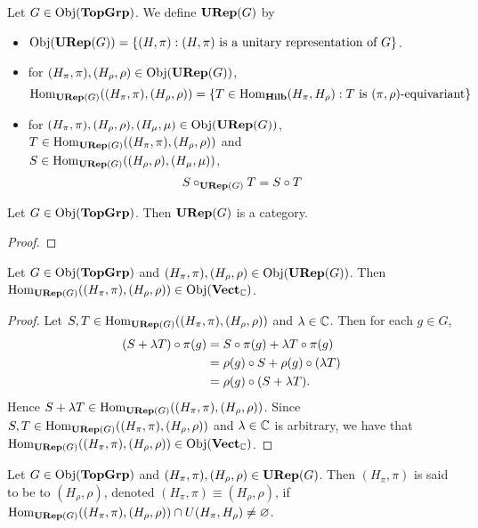 \documentclass{book}
\begin{document}
	\begin{defn} 
		Let $G \in \Obj(\TopGrp)$. We define $\URep(G)$ by 
		\begin{itemize}
			\item $\Obj(\URep(G)) = \{(H, \pi): (H, \pi) \text{ is a unitary representation of $G$}\}$.
			\item for $(H_{\pi}, \pi),(H_{\rho}, \rho) \in \Obj(\URep(G))$, 
			$$\Hom_{\URep(G)}((H_{\pi}, \pi), (H_{\rho}, \rho)) = \{T \in \Hom_{\Hilb}(H_{\pi}, H_{\rho}): T \text{ is $(\pi, \rho)$-equivariant} \}$$
			\item for $(H_{\pi}, \pi), (H_{\rho}, \rho), (H_{\mu}, \mu) \in \Obj(\URep(G))$, $T \in \Hom_{\URep(G)}((H_{\pi}, \pi), (H_{\rho}, \rho))$ and \\
			$S \in  \Hom_{\URep(G)}((H_{\rho}, \rho), (H_{\mu}, \mu))$, 
			$$S \circ_{\URep(G)} T = S \circ T$$
		\end{itemize}
	\end{defn}
	
	\begin{ex}
		Let $G \in \Obj(\TopGrp)$. Then $\URep(G)$ is a category.
	\end{ex}
	
	\begin{proof}
	\end{proof}

	\begin{ex}
		Let $G \in \Obj(\TopGrp)$ and $(H_{\pi}, \pi), (H_{\rho}, \rho) \in \Obj(\URep(G))$. Then $\Hom_{\URep(G)}((H_{\pi}, \pi), (H_{\rho}, \rho)) \in \Obj(\VectC)$.
	\end{ex}

	\begin{proof}
		Let $S,T \in \Hom_{\URep(G)}((H_{\pi}, \pi), (H_{\rho}, \rho)) $ and $\lam \in \C$. Then for each $g \in G$,
		\begin{align*}
			(S + \lam T) \circ \pi(g) 
			& = S \circ \pi(g)  + \lam T \circ \pi(g) \\
			& = \rho(g) \circ S + \rho(g) \circ (\lam T) \\
			& = \rho(g) \circ (S + \lam T).
		\end{align*}
		Hence $S + \lam T \in \Hom_{\URep(G)}((H_{\pi}, \pi), (H_{\rho}, \rho)) $. Since $S, T \in \Hom_{\URep(G)}((H_{\pi}, \pi), (H_{\rho}, \rho)) $ and $\lam \in \C$ is arbitrary, we have that $\Hom_{\URep(G)}((H_{\pi}, \pi), (H_{\rho}, \rho)) \in \Obj(\VectC)$.
	\end{proof}
	
	\begin{defn}
		Let $G \in \Obj(\TopGrp)$ and $(H_{\pi}, \pi), (H_{\rho}, \rho) \in \URep(G)$. Then $(H_{\pi}, \pi)$ is said to be  to $(H_{\rho}, \rho)$, denoted $(H_{\pi}, \pi) \equiv (H_{\rho}, \rho)$, if $\Hom_{\URep(G)}((H_{\pi}, \pi), (H_{\rho}, \rho)) \cap U(H_{\pi}, H_{\rho}) \neq \varnothing$.
	\end{defn}
	
\end{document}
